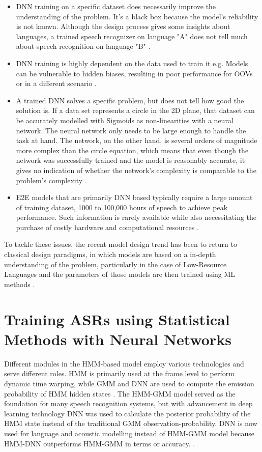 \begin{itemize}
    \item DNN training on a specific dataset does necessarily improve the understanding of the problem. It's a black box because the model's reliability is not known. Although the design process gives some insights about languages, a trained speech recognizer on language "A" does not tell much about speech recognition on language "B" \cite{backstrom_introduction_2022}.
    \item DNN training is highly dependent on the data used to train it e.g. Models can be vulnerable to hidden biases, resulting in poor performance for OOVs or in a different scenario \cite{zhang_strategies_2019}.
    \item A trained DNN solves a specific problem, but does not tell how good the solution is. If a data set represents a circle in the 2D plane, that dataset can be accurately modelled with Sigmoids as non-linearities with a neural network. The neural network only needs to be large enough to handle the task at hand. The network, on the other hand, is several orders of magnitude more complex than the circle equation, which means that even though the network was successfully trained and the model is reasonably accurate, it gives no indication of whether the network's complexity is comparable to the problem's complexity \cite{backstrom_introduction_2022}.
    \item E2E models that are primarily DNN based typically require a large amount of training dataset, 1000 to 100,000 hours of speech to achieve peak performance. Such information is rarely available while also necessitating the purchase of costly hardware and computational resources \cite{kincaid_state_2018}.
    
\end{itemize}

To tackle these issues, the recent model design trend has been to return to classical design paradigms, in which models are based on a in-depth understanding of the problem, particularly in the case of Low-Resource Languages and the parameters of those models are then trained using ML methods \cite{backstrom_introduction_2022}.   

\section{Training ASRs using Statistical Methods with Neural Networks}

Different modules in the HMM-based model employ various technologies and serve different roles. HMM is primarily used at the frame level to perform dynamic time warping, while GMM and DNN are used to compute the emission probability of HMM hidden states \cite{georgescu_kaldi-based_2019}. The HMM-GMM model served as the foundation for many speech recognition systems, but with advancement in deep learning technology DNN was used to calculate the posterior probability of the HMM state instead of the traditional GMM observation-probability. DNN is now used for language and acoustic modelling instead of HMM-GMM model because HMM-DNN outperforms HMM-GMM in terms or accuracy. \cite{dahl_context-dependent_2012}. %

